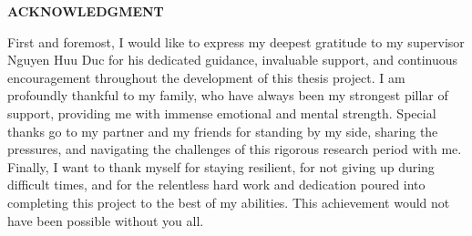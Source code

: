 \documentclass[../main.tex]{subfiles}
\begin{document}
\begin{center}
    \Large{\textbf{ACKNOWLEDGMENT}}\\
\end{center}
\vspace{1cm}
First and foremost, I would like to express my deepest gratitude to my supervisor Nguyen Huu Duc for his dedicated guidance, invaluable support, and continuous encouragement throughout the development of this thesis project. I am profoundly thankful to my family, who have always been my strongest pillar of support, providing me with immense emotional and mental strength. Special thanks go to my partner and my friends for standing by my side, sharing the pressures, and navigating the challenges of this rigorous research period with me. Finally, I want to thank myself for staying resilient, for not giving up during difficult times, and for the relentless hard work and dedication poured into completing this project to the best of my abilities. This achievement would not have been possible without you all. 
\end{document}
